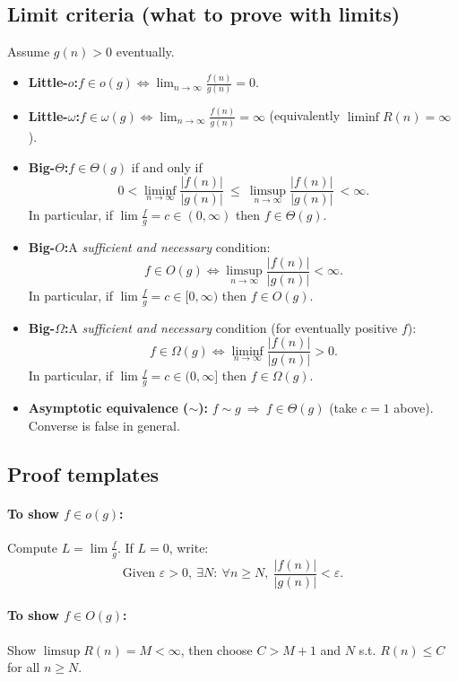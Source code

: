 \documentclass[9pt]{extarticle}
\begin{document}
\subsection*{Limit criteria (what to prove with limits)}
Assume $g(n)>0$ eventually.
\begin{itemize}
  \item \textbf{Little-$o$:}\quad $f\in o(g)\iff \displaystyle\lim_{n\to\infty}\frac{f(n)}{g(n)}=0$.
  \item \textbf{Little-$\omega$:}\quad $f\in \omega(g)\iff \displaystyle\lim_{n\to\infty}\frac{f(n)}{g(n)}=\infty$ (equivalently $\liminf R(n)=\infty$).
  \item \textbf{Big-$\Theta$:}\quad $f\in \Theta(g)$ if and only if
  \[
    0<\liminf_{n\to\infty}\frac{|f(n)|}{|g(n)|}\ \le\ \limsup_{n\to\infty}\frac{|f(n)|}{|g(n)|}\ <\infty.
  \]
  In particular, if $\lim \frac{f}{g}=c\in(0,\infty)$ then $f\in\Theta(g)$.
  \item \textbf{Big-$O$:}\quad A \emph{sufficient and necessary} condition:
  \[
    f\in O(g)\iff \limsup_{n\to\infty}\frac{|f(n)|}{|g(n)|}<\infty.
  \]
  In particular, if $\lim \frac{f}{g}=c\in[0,\infty)$ then $f\in O(g)$.
  \item \textbf{Big-$\Omega$:}\quad A \emph{sufficient and necessary} condition (for eventually positive $f$):
  \[
    f\in \Omega(g)\iff \liminf_{n\to\infty}\frac{|f(n)|}{|g(n)|}>0.
  \]
  In particular, if $\lim \frac{f}{g}=c\in(0,\infty]$ then $f\in \Omega(g)$.
  \item \textbf{Asymptotic equivalence ($\sim$):} $f\sim g\ \Rightarrow\ f\in\Theta(g)$ (take $c=1$ above). Converse is false in general.
\end{itemize}

\subsection*{Proof templates}
\paragraph{To show $f\in o(g)$:} Compute $L=\lim \frac{f}{g}$. If $L=0$, write: 
\[
\text{Given }\varepsilon>0,\ \exists N:\ \forall n\ge N,\ \frac{|f(n)|}{|g(n)|}<\varepsilon.
\]

\paragraph{To show $f\in O(g)$:} Show $\limsup R(n)=M<\infty$, then choose $C>M+1$ and $N$ s.t. $R(n)\le C$ for all $n\ge N$.
\end{document}
